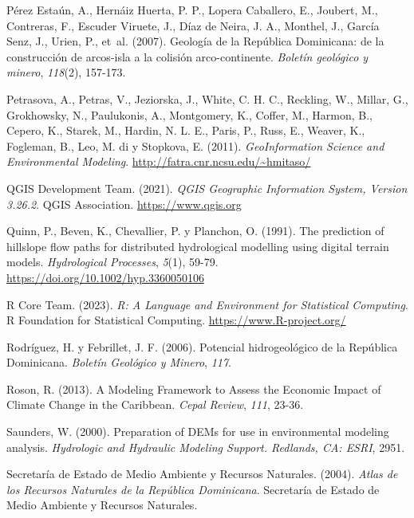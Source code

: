 \documentclass[spanish]{article}
\newlength{\cslhangindent}
\newlength{\cslentryspacingunit} %
\newenvironment{CSLReferences}[2] %
 {%
  \setlength{\parindent}{0pt}
  \ifodd #1
  \let\oldpar\par
  \def\par{\hangindent=\cslhangindent\oldpar}
  \fi
  \setlength{\parskip}{#2\cslentryspacingunit}
 }%
 {}
\begin{document}
\begin{CSLReferences}{1}{0}
\leavevmode{}%
Pérez Estaún, A., Hernáiz Huerta, P. P., Lopera Caballero, E., Joubert,
M., Contreras, F., Escuder Viruete, J., Díaz de Neira, J. A., Monthel,
J., García Senz, J., Urien, P., et~al. (2007). {Geología de la República
Dominicana: de la construcción de arcos-isla a la colisión
arco-continente}. \emph{Boletín geológico y minero}, \emph{118}(2),
157-173.

\leavevmode{}%
Petrasova, A., Petras, V., Jeziorska, J., White, C. H. C., Reckling, W.,
Millar, G., Grokhowsky, N., Paulukonis, A., Montgomery, K., Coffer, M.,
Harmon, B., Cepero, K., Starek, M., Hardin, N. L. E., Paris, P., Russ,
E., Weaver, K., Fogleman, B., Leo, M. di y Stopkova, E. (2011).
\emph{GeoInformation Science and Environmental Modeling}.
\url{http://fatra.cnr.ncsu.edu/~hmitaso/}

\leavevmode{}%
QGIS Development Team. (2021). \emph{QGIS Geographic Information System,
Version 3.26.2}. QGIS Association. \url{https://www.qgis.org}

\leavevmode{}%
Quinn, P., Beven, K., Chevallier, P. y Planchon, O. (1991). The
prediction of hillslope flow paths for distributed hydrological
modelling using digital terrain models. \emph{Hydrological Processes},
\emph{5}(1), 59-79. \url{https://doi.org/10.1002/hyp.3360050106}

\leavevmode{}%
R Core Team. (2023). \emph{R: A Language and Environment for Statistical
Computing}. R Foundation for Statistical Computing.
\url{https://www.R-project.org/}

\leavevmode{}%
Rodríguez, H. y Febrillet, J. F. (2006). {Potencial hidrogeológico de la
República Dominicana}. \emph{Boletín Geológico y Minero}, \emph{117}.

\leavevmode{}%
Roson, R. (2013). A Modeling Framework to Assess the Economic Impact of
Climate Change in the Caribbean. \emph{Cepal Review}, \emph{111}, 23-36.

\leavevmode{}%
Saunders, W. (2000). Preparation of DEMs for use in environmental
modeling analysis. \emph{Hydrologic and Hydraulic Modeling Support.
Redlands, CA: ESRI}, 2951.

\leavevmode{}%
Secretaría de Estado de Medio Ambiente y Recursos Naturales. (2004).
\emph{{Atlas de los Recursos Naturales de la República Dominicana}}.
{Secretaría de Estado de Medio Ambiente y Recursos Naturales}.


\end{CSLReferences}
\end{document}
